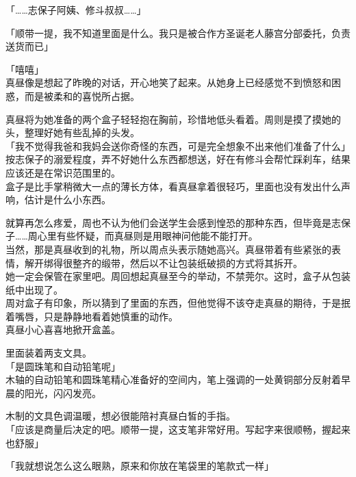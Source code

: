 「……志保子阿姨、修斗叔叔……」

「顺带一提，我不知道里面是什么。我只是被合作方圣诞老人藤宫分部委托，负责送货而已」

「嘻嘻」\\

真昼像是想起了昨晚的对话，开心地笑了起来。从她身上已经感觉不到愤怒和困惑，而是被柔和的喜悦所占据。

真昼将为她准备的两个盒子轻轻抱在胸前，珍惜地低头看着。周则是摸了摸她的头，整理好她有些乱掉的头发。\\

「我不觉得我爸和我妈会送你奇怪的东西，可是完全想象不出来他们准备了什么」\\

按志保子的溺爱程度，弄不好她什么东西都想送，好在有修斗会帮忙踩刹车，结果应该还是在常识范围里的。\\

盒子是比手掌稍微大一点的薄长方体，看真昼拿着很轻巧，里面也没有发出什么声响，估计是什么小东西。

就算再怎么疼爱，周也不认为他们会送学生会感到惶恐的那种东西，但毕竟是志保子……周心里有些怀疑，而真昼则是用眼神问他能不能打开。\\

当然，那是真昼收到的礼物，所以周点头表示随她高兴。真昼带着有些紧张的表情，解开绑得很整齐的缎带，然后以不让包装纸破损的方式将其拆开。\\

她一定会保管在家里吧。周回想起真昼至今的举动，不禁莞尔。这时，盒子从包装纸中出现了。\\

周对盒子有印象，所以猜到了里面的东西，但他觉得不该夺走真昼的期待，于是抿着嘴唇，只是静静地看着她慎重的动作。\\

真昼小心喜喜地掀开盒盖。

里面装着两支文具。\\

「是圆珠笔和自动铅笔呢」\\

木轴的自动铅笔和圆珠笔精心准备好的空间内，笔上强调的一处黄铜部分反射着早晨的阳光，闪闪发亮。

木制的文具色调温暖，想必很能陪衬真昼白皙的手指。\\

「应该是商量后决定的吧。顺带一提，这支笔非常好用。写起字来很顺畅，握起来也舒服」

「我就想说怎么这么眼熟，原来和你放在笔袋里的笔款式一样」\\

